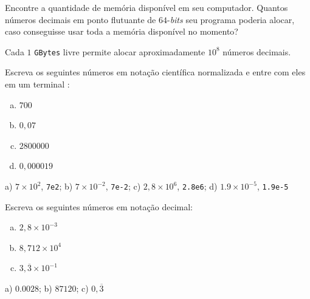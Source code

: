 \begin{exer}
  Encontre a quantidade de memória disponível em seu computador. Quantos números decimais em ponto flutuante de $64$-\textit{bits} seu programa poderia alocar, caso conseguisse usar toda a memória disponível no momento?
\end{exer}
\begin{resp}
  Cada $1$ \texttt{GBytes} livre permite alocar aproximadamente $10^8$ números decimais.
\end{resp}

\begin{exer}
  Escreva os seguintes números em notação científica normalizada e entre com eles em um terminal {\python}:
  \begin{enumerate}[a)]
  \item $700$
  \item $0,07$
  \item $2800000$
  \item $0,000019$
  \end{enumerate}
\end{exer}
\begin{resp}
  a) $7\times 10^2$, \lstinline+7e2+; b) $7\times 10^{-2}$, \lstinline+7e-2+; c) $2,8\times 10^6$, \lstinline+2.8e6+; d) $1.9\times 10^{-5}$, \lstinline+1.9e-5+
\end{resp}

\begin{exer}
  Escreva os seguintes números em notação decimal:
  \begin{enumerate}[a)]
  \item $2,8\times 10^{-3}$
  \item $8,712\times 10^4$
  \item $3,\overline{3}\times 10^{-1}$
  \end{enumerate}
\end{exer}
\begin{resp}
  a) $0.0028$; b) $87120$; c) $0,\overline{3}$
\end{resp}

